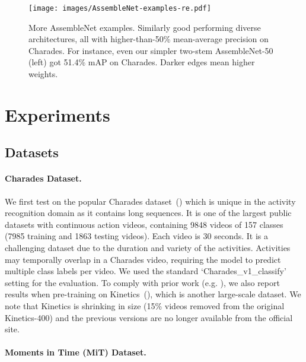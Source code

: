 \documentclass{article} \usepackage{iclr2020_conference,times}
\begin{document}
\begin{figure}
  \centering
\texttt{[image: images/AssembleNet-examples-re.pdf]}\caption{More AssembleNet examples. Similarly good performing diverse architectures, all with higher-than-50\% mean-average precision on Charades. For instance, even our simpler two-stem AssembleNet-50 (left) got 51.4\% mAP on Charades. Darker edges mean higher weights.}
  \label{fig:architecture-examples}
\end{figure}

\section{Experiments}
\vspace{-5pt}
\subsection{Datasets}



\vspace{-5pt}
\paragraph{Charades Dataset.}
We first test on the popular Charades dataset~(\citealp{sigurdsson2016hollywood}) which is unique in the activity recognition domain as it contains long sequences. It is one of the largest public datasets with continuous action videos, containing 9848 videos of 157 classes (7985 training and 1863 testing videos). Each video is 30 seconds. It is a challenging dataset due to the duration and variety of the activities. Activities may temporally overlap in a Charades video, requiring the model to predict multiple class labels per video. We used the standard `Charades\_v1\_classify' setting for the evaluation. To comply with prior work (e.g. \citealp{feichtenhofer2018slowfast}), we also report results when pre-training on Kinetics~(\citealp{carreira2017quo}), which is another large-scale dataset. We note that Kinetics is shrinking in size (15\% videos removed from the original Kinetics-400) and the previous versions are no longer available from the official site.


\vspace{-5pt}
\paragraph{Moments in Time (MiT) Dataset.}
\end{document}

